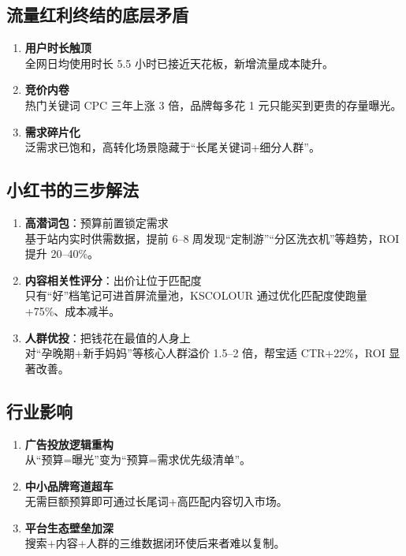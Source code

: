 \subsection{流量红利终结的底层矛盾}
\begin{enumerate}[leftmargin=*, nosep]
    \item \textbf{用户时长触顶}  \\
    全网日均使用时长 5.5 小时已接近天花板，新增流量成本陡升。
    \item \textbf{竞价内卷}  \\
    热门关键词 CPC 三年上涨 3 倍，品牌每多花 1 元只能买到更贵的存量曝光。
    \item \textbf{需求碎片化}  \\
    泛需求已饱和，高转化场景隐藏于“长尾关键词+细分人群”。
\end{enumerate}

\subsection{小红书的三步解法}
\begin{enumerate}[leftmargin=*, nosep]
    \item \textbf{高潜词包}：预算前置锁定需求  \\
    基于站内实时供需数据，提前 6–8 周发现“定制游”“分区洗衣机”等趋势，ROI 提升 20–40\%。
    \item \textbf{内容相关性评分}：出价让位于匹配度  \\
    只有“好”档笔记可进首屏流量池，KSCOLOUR 通过优化匹配度使跑量+75\%、成本减半。
    \item \textbf{人群优投}：把钱花在最值的人身上  \\
    对“孕晚期+新手妈妈”等核心人群溢价 1.5–2 倍，帮宝适 CTR+22\%，ROI 显著改善。
\end{enumerate}

\subsection{行业影响}
\begin{enumerate}[leftmargin=*, nosep]
    \item \textbf{广告投放逻辑重构}  \\
    从“预算=曝光”变为“预算=需求优先级清单”。
    \item \textbf{中小品牌弯道超车}  \\
    无需巨额预算即可通过长尾词+高匹配内容切入市场。
    \item \textbf{平台生态壁垒加深}  \\
    搜索+内容+人群的三维数据闭环使后来者难以复制。
\end{enumerate}

